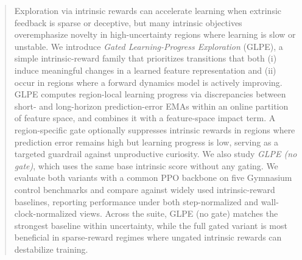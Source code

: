 \begin{abstract}
Exploration via intrinsic rewards can accelerate learning when extrinsic feedback is sparse or deceptive, but many intrinsic objectives overemphasize novelty in high-uncertainty regions where learning is slow or unstable.
We introduce \emph{Gated Learning-Progress Exploration} (GLPE), a simple intrinsic-reward family that prioritizes transitions that both (i) induce meaningful changes in a learned feature representation and (ii) occur in regions where a forward dynamics model is actively improving.
GLPE computes region-local learning progress via discrepancies between short- and long-horizon prediction-error EMAs within an online partition of feature space, and combines it with a feature-space impact term.
A region-specific gate optionally suppresses intrinsic rewards in regions where prediction error remains high but learning progress is low, serving as a targeted guardrail against unproductive curiosity.
We also study \emph{GLPE (no gate)}, which uses the same base intrinsic score without any gating.
We evaluate both variants with a common PPO backbone on five Gymnasium control benchmarks and compare against widely used intrinsic-reward baselines, reporting performance under both step-normalized and wall-clock-normalized views.
Across the suite, GLPE (no gate) matches the strongest baseline within uncertainty, while the full gated variant is most beneficial in sparse-reward regimes where ungated intrinsic rewards can destabilize training.
\end{abstract}
